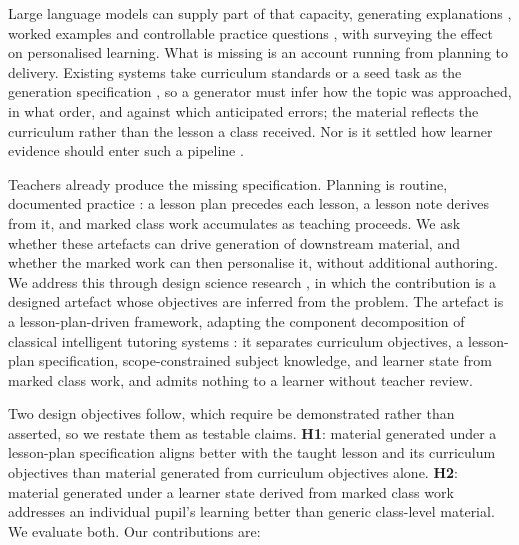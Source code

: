\documentclass{article}
\begin{document}
Large language models can supply part of that capacity, generating explanations
\citep{leinonen2023}, worked examples \citep{jury2024} and controllable practice questions
\citep{li2024}, with \citet{sharma2025} surveying the effect on personalised learning. What is
missing is an account running from planning to delivery. Existing systems take curriculum standards or a seed task as the generation
specification \citep{cogent,facet,lectura}, so a generator must infer how the topic was
approached, in what order, and against which anticipated errors; the material reflects the
curriculum rather than the lesson a class received. Nor is it settled how
learner evidence should enter such a pipeline \citep{cho2024}.

Teachers already produce the missing specification. Planning is routine, documented practice
\citep{yinger1980,musingafi2015}: a lesson plan precedes each lesson, a lesson note derives from
it, and marked class work accumulates as teaching proceeds. We ask whether these artefacts can
drive generation of downstream material, and whether the marked work can then personalise it,
without additional authoring. We address this through design science research
\citep{hevner2004,peffers2007}, in which the contribution is a designed artefact whose
objectives are inferred from the problem. The artefact is a lesson-plan-driven framework,
adapting the component decomposition of classical intelligent tutoring systems
\citep{wenger1987,nwana1990}: it separates curriculum objectives, a lesson-plan specification,
scope-constrained subject knowledge, and learner state from marked class work, and admits
nothing to a learner without teacher review.

Two design objectives follow, which \citet{hevner2004} require be demonstrated rather than
asserted, so we restate them as testable claims. \textbf{H1}: material generated under a
lesson-plan specification aligns better with the taught lesson and its curriculum objectives
than material generated from curriculum objectives alone. \textbf{H2}: material generated under
a learner state derived from marked class work addresses an individual pupil's learning better
than generic class-level material. We evaluate both. Our contributions are:
\end{document}
